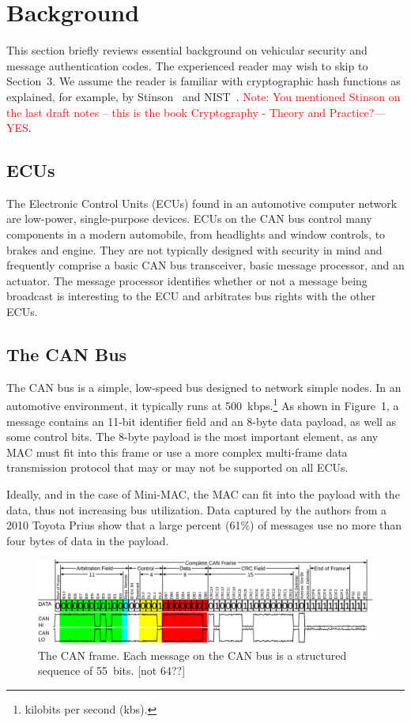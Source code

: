 \section{Background}
This section briefly reviews essential background on vehicular security and message authentication codes. 
The experienced reader may wish to skip to Section~3. 
We assume the reader is familiar with cryptographic hash functions as explained, for example, by Stinson~\cite{Sti} and NIST~\cite{FIPS-180-4}.
\textcolor{red}{Note: You mentioned Stinson on the last draft notes -- this is the book Cryptography - Theory and Practice?---YES}.

\subsection{ECUs}
The Electronic Control Units (ECUs) found in an automotive computer network are low-power, single-purpose devices. ECUs on the CAN bus control many components in a modern automobile, from headlights and window controls, to brakes and engine. They are not typically designed with security in mind and frequently comprise a basic CAN bus transceiver, basic message processor, and an actuator. The message processor identifies whether or not a message being broadcast is interesting to the ECU and arbitrates bus rights with the other ECUs. 

\subsection{The CAN Bus}
The CAN bus is a simple, low-speed bus designed to network simple nodes. In an automotive environment, 
it typically runs at 500~kbps.\footnote{kilobits per second (kbs).} As shown in Figure~1, a message contains an 11-bit identifier field and an 8-byte data payload, as well as some control bits. The 8-byte payload is the most important element, as any MAC must fit into this frame or use a more complex multi-frame data transmission protocol that may or may not be supported on all ECUs. 

Ideally, and in the case of Mini-MAC, the MAC can fit into the payload with the data, thus not increasing bus utilization. Data captured by the authors from a 2010 Toyota Prius show that a large percent (61\%) of messages use no more than four bytes of data in the payload.

	\begin{figure}
		\centering
		\includegraphics[width=\linewidth]{figures/can_frame.png}
		\caption{The CAN frame.  Each message on the CAN bus is a structured sequence of 55~bits. [not 64??]}
	\end{figure}

